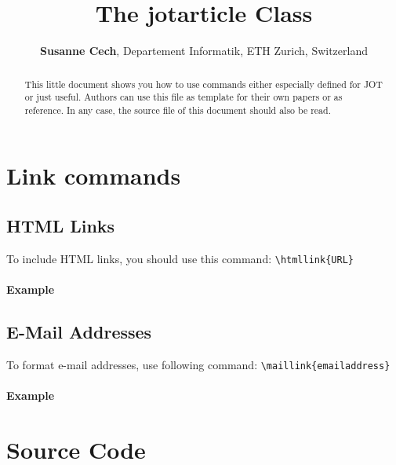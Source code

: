 \documentclass{jotarticle}
\title{The jotarticle Class}
\author{\textbf{Susanne Cech}, Departement Informatik, 
        ETH Zurich, Switzerland}
\begin{document}

\begin{abstract}
This little document shows you how to use commands either especially
defined for JOT or just useful. Authors can use this file as template
for their own papers or as reference. In any case, the source file
of this document should also be read.
\end{abstract}


\section{Link commands}

\subsection{HTML Links}

To include HTML links, you should use this command: \verb|\htmllink{URL}|

\paragraph{Example} 


\subsection{E-Mail Addresses}

To format e-mail addresses, use following command: 
\verb|\maillink{emailaddress}|

\paragraph{Example} 


\section{Source Code}
\end{document}
